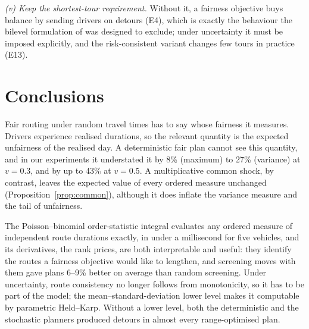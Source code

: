 \documentclass[11pt]{article}
\theoremstyle{definition}
\begin{document}
\emph{(v) Keep the shortest-tour requirement.} Without it, a fairness
objective buys balance by sending drivers on detours (E4), which is exactly
the behaviour the bilevel formulation of \citet{ljubic2026fair} was designed
to exclude; under uncertainty it must be imposed explicitly, and the
risk-consistent variant changes few tours in practice (E13).

\section{Conclusions}\label{sec:concl}
Fair routing under random travel times has to say whose fairness it measures.
Drivers experience realised durations, so the relevant quantity is the
expected unfairness of the realised day. A deterministic fair plan cannot
see this quantity, and in our experiments it understated it by 8\% (maximum)
to 27\% (variance) at $v=0.3$, and by up to 43\% at $v=0.5$. A multiplicative common shock, by contrast, leaves the expected value of
every ordered measure unchanged (Proposition~\ref{prop:common}), although it
does inflate the variance measure and the tail of unfairness.

The Poisson--binomial order-statistic integral evaluates any ordered measure
of independent route durations exactly, in under a millisecond for five
vehicles, and its derivatives, the rank prices, are both interpretable and
useful: they identify the routes a fairness objective would like to lengthen,
and screening moves with them gave plans 6--9\% better on average than
random screening. Under uncertainty, route consistency no longer follows from
monotonicity, so it has to be part of the model; the mean--standard-deviation
lower level makes it computable by parametric Held--Karp. Without a lower
level, both the deterministic and the stochastic planners produced detours in
almost every range-optimised plan.
\end{document}
